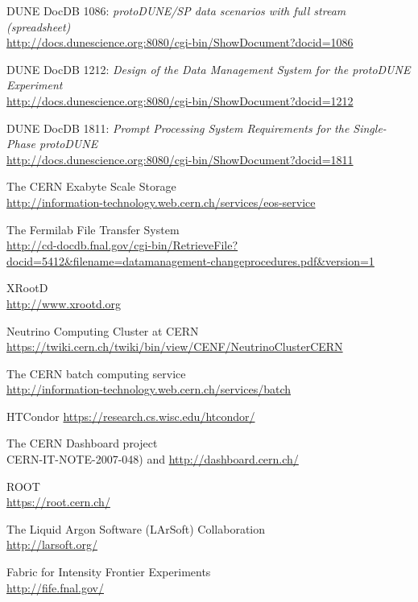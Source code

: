 \documentclass[pdftex,12pt,letter]{article}
\begin{document}
\clearpage
\begin{thebibliography}{1}
{DUNE DocDB 1086: \textit{ protoDUNE/SP data scenarios with full stream (spreadsheet)}}\\
\url{http://docs.dunescience.org:8080/cgi-bin/ShowDocument?docid=1086}


{DUNE DocDB 1212: \textit{Design of the Data Management System for the protoDUNE Experiment}}\\
\url{http://docs.dunescience.org:8080/cgi-bin/ShowDocument?docid=1212}


{DUNE DocDB 1811: \textit{Prompt Processing System Requirements for the Single-Phase protoDUNE}}\\
\url{http://docs.dunescience.org:8080/cgi-bin/ShowDocument?docid=1811}

{The CERN Exabyte Scale Storage}\\
\url{http://information-technology.web.cern.ch/services/eos-service}

{The Fermilab File Transfer System}\\
\url{http://cd-docdb.fnal.gov/cgi-bin/RetrieveFile?docid=5412&filename=datamanagement-changeprocedures.pdf&version=1}


{XRootD}\\
\url{http://www.xrootd.org}

{Neutrino Computing Cluster at CERN}\\
\url{https://twiki.cern.ch/twiki/bin/view/CENF/NeutrinoClusterCERN}

{The CERN batch computing service}\\
\url{http://information-technology.web.cern.ch/services/batch}


{HTCondor}
\url{https://research.cs.wisc.edu/htcondor/}

{The CERN Dashboard project}\\
CERN-IT-NOTE-2007-048) and \url{http://dashboard.cern.ch/}

{ROOT}\\
\url{https://root.cern.ch/}


{The Liquid Argon Software (LArSoft) Collaboration}\\
\url{http://larsoft.org/}

{Fabric for Intensity Frontier Experiments}\\
\url{http://fife.fnal.gov/}



\end{thebibliography}
\end{document}
